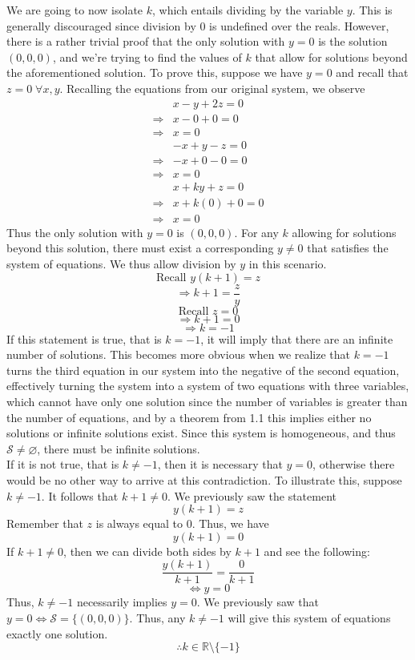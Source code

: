 \documentclass{article}
\newcommand{\R}{\mathbb{R}} %
\begin{document}
We are going to now isolate $k$, which entails dividing by the variable $y$. This is generally discouraged since division by $0$ is undefined over the reals. However, there is a rather trivial proof that the only solution with $y=0$ is the solution $(0,0,0)$, and we're trying to find the values of $k$ that allow for solutions beyond the aforementioned solution. To prove this, suppose we have $y=0$ and recall that $z=0\;\forall x,y$. Recalling the equations from our original system, we observe
\begin{align*}
	&x-y+2z=0\\
	\Rightarrow&x-0+0=0\\
	\Rightarrow&x=0\\
	&-x+y-z=0\\
	\Rightarrow&-x+0-0=0\\
	\Rightarrow&x=0\\
	&x+ky+z=0\\
	\Rightarrow&x+k(0)+0=0\\
	\Rightarrow&x=0
\end{align*}
Thus the only solution with $y=0$ is $(0,0,0)$. For any $k$ allowing for solutions beyond this solution, there must exist a corresponding $y\neq0$ that satisfies the system of equations. We thus allow division by $y$ in this scenario.
$$\text{Recall }y(k+1)=z$$
$$\Rightarrow k+1=\frac{z}{y}$$
$$\text{Recall }z=0$$
$$\Rightarrow k+1=0$$
$$\Rightarrow k=-1$$
If this statement is true, that is $k=-1$, it will imply that there are an infinite number of solutions. This becomes more obvious when we realize that $k=-1$ turns the third equation in our system into the negative of the second equation, effectively turning the system into a system of two equations with three variables, which cannot have only one solution since the number of variables is greater than the number of equations, and by a theorem from 1.1 this implies either no solutions or infinite solutions exist. Since this system is homogeneous, and thus $\mathcal{S}\neq\varnothing$, there must be infinite solutions.\\
If it is not true, that is $k\neq-1$, then it is necessary that $y=0$, otherwise there would be no other way to arrive at this contradiction. To illustrate this, suppose $k\neq-1$. It follows that $k+1\neq0$. We previously saw the statement
$$y(k+1)=z$$
Remember that $z$ is always equal to 0. Thus, we have
$$y(k+1)=0$$
If $k+1\neq0$, then we can divide both sides by $k+1$ and see the following:
$$\frac{y(k+1)}{k+1}=\frac{0}{k+1}$$
$$\Leftrightarrow y=0$$
Thus, $k\neq-1$ necessarily implies $y=0$. We previously saw that $y=0\Leftrightarrow\mathcal{S}=\{(0,0,0)\}$. Thus, any $k\neq-1$ will give this system of equations exactly one solution.
$$\therefore k\in\R\setminus\{-1\}$$\vspace{3mm}\\
\end{document}
